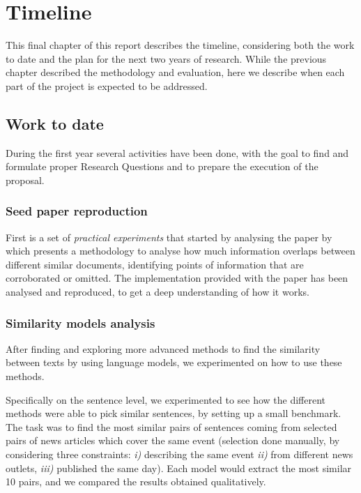\chapter{Timeline}
\label{chap:plan}

This final chapter of this report describes the timeline, considering both the work to date and the plan for the next two years of research.
While the previous chapter described the methodology and evaluation, here we describe when each part of the project is expected to be addressed.

\section{Work to date}

During the first year several activities have been done, with the goal to find and formulate proper Research Questions and to prepare the execution of the proposal.


\subsection{Seed paper reproduction}
First is a set of \emph{practical experiments} that started by analysing the paper by~\citet{bountouridis2018explaining} which presents a methodology to analyse how much information overlaps between different similar documents, identifying points of information that are corroborated or omitted.
The implementation provided with the paper has been analysed and reproduced, to get a deep understanding of how it works.



\subsection{Similarity models analysis}
After finding and exploring more advanced methods to find the similarity between texts by using language models, we experimented on how to use these methods.

Specifically on the sentence level, we experimented to see how the different methods were able to pick similar sentences, by setting up a small benchmark. The task was to find the most similar pairs of sentences coming from selected pairs of news articles which cover the same event (selection done manually, by considering three constraints: \textit{i)} describing the same event \textit{ii)} from different news outlets, \textit{iii)} published the same day).
Each model would extract the most similar 10 pairs, and we compared the results obtained qualitatively.

